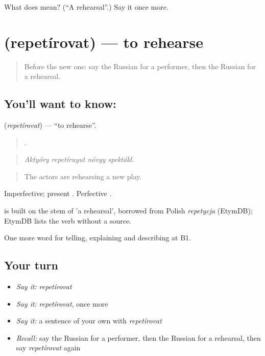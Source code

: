 \begin{tcolorbox}[breakable,colback=teal!4,colframe=teal!35!black,title={Before you move on}]
What does  mean? (\textquotedblleft{}A rehearsal\textquotedblright{}.) Say it once more.
\end{tcolorbox}
\section[\texorpdfstring{\ru{репетировать} (repetírovat)}{репетировать (repetírovat)}]{ (repetírovat) — to rehearse}

\label{lesson:RU-C518-repetirovat}



\begin{quote}
Before the new one: say the Russian for a performer, then the Russian for a rehearsal.
\end{quote}

\subsection*{You'll want to know: }
\textbf{} (\emph{repetírovat}) — \textquotedblleft{}to rehearse\textquotedblright{}.

\begin{quote}
   .
\end{quote}

\begin{quote}
\emph{Aktyóry repetíruyut nóvyy spektákl.}
\end{quote}

\begin{quote}
The actors are rehearsing a new play.
\end{quote}

Imperfective; present . Perfective .

\begin{cousinweb}
\emph{} is built on the stem of \emph{} 'a rehearsal', borrowed from Polish \emph{repetycja} (EtymDB); EtymDB lists the verb without a source.
\end{cousinweb}

\begin{grammarlens}[title={What you've built}]
One more word for telling, explaining and describing at B1.
\end{grammarlens}

\subsection*{Your turn}
\begin{itemize}
\raggedright
  \item \emph{Say it:} \emph{repetírovat}
  \item \emph{Say it:} \emph{repetírovat}, once more
  \item \emph{Say it:} a sentence of your own with \emph{repetírovat}
  \item \emph{Recall:} say the Russian for a performer, then the Russian for a rehearsal, then say \emph{repetírovat} again
\end{itemize}


